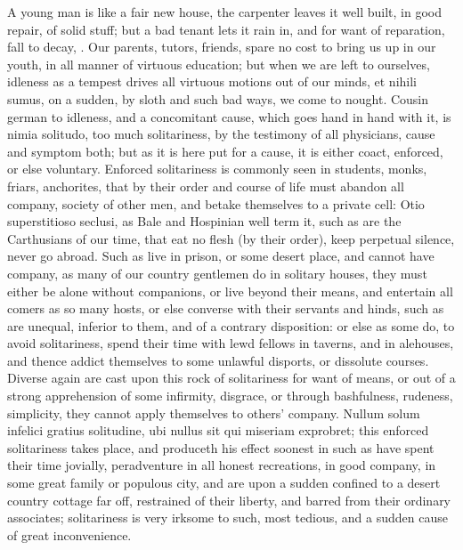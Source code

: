 {{A young man is like a fair new house, the carpenter leaves it well
built, in good repair, of solid stuff; but a bad tenant lets it rain
in, and for want of reparation, fall to decay, \etc{}. Our parents, tutors,
friends, spare no cost to bring us up in our youth, in all manner of
virtuous education; but when we are left to ourselves, idleness as a
tempest drives all virtuous motions out of our minds, et nihili sumus,
on a sudden, by sloth and such bad ways, we come to nought.
Cousin german to idleness, and a concomitant cause, which goes hand in
hand with it, is nimia solitudo, too much solitariness, by the
testimony of all physicians, cause and symptom both; but as it is here
put for a cause, it is either coact, enforced, or else voluntary.
Enforced solitariness is commonly seen in students, monks, friars,
anchorites, that by their order and course of life must abandon all
company, society of other men, and betake themselves to a private cell:
Otio superstitioso seclusi, as Bale and Hospinian well term it, such as
are the Carthusians of our time, that eat no flesh (by their order),
keep perpetual silence, never go abroad. Such as live in prison, or
some desert place, and cannot have company, as many of our country
gentlemen do in solitary houses, they must either be alone without
companions, or live beyond their means, and entertain all comers as so
many hosts, or else converse with their servants and hinds, such as are
unequal, inferior to them, and of a contrary disposition: or else as
some do, to avoid solitariness, spend their time with lewd fellows in
taverns, and in alehouses, and thence addict themselves to some
unlawful disports, or dissolute courses. Diverse again are cast upon
this rock of solitariness for want of means, or out of a strong
apprehension of some infirmity, disgrace, or through bashfulness,
rudeness, simplicity, they cannot apply themselves to others' company.
Nullum solum infelici gratius solitudine, ubi nullus sit qui miseriam
exprobret; this enforced solitariness takes place, and produceth his
effect soonest in such as have spent their time jovially, peradventure
in all honest recreations, in good company, in some great family or
populous city, and are upon a sudden confined to a desert country
cottage far off, restrained of their liberty, and barred from their
ordinary associates; solitariness is very irksome to such, most
tedious, and a sudden cause of great inconvenience.

}}
